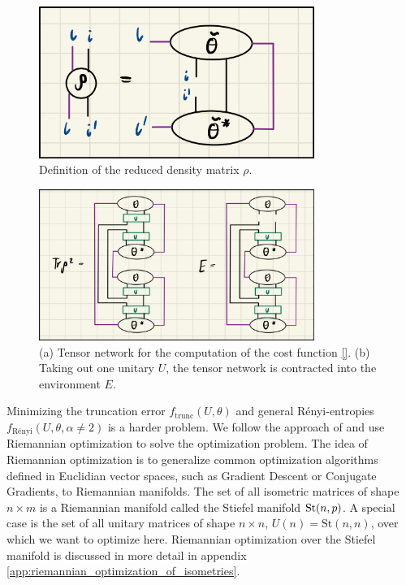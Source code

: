 \begin{figure}
	\centering
	\includegraphics[width=0.8\textwidth]{figures/disoTPS/disentangling_rho_definition.jpeg}
	\caption{Definition of the reduced density matrix $\rho$.}
	\label{fig:disentangling_rho_definition}
\end{figure}
\begin{figure}
	\centering
	\includegraphics[width=0.8\textwidth]{figures/disoTPS/disentangling_evenbly_vidal_algorithm.jpeg}
	\caption{(a) Tensor network for the computation of the cost function \eqref{}. (b) Taking out one unitary $U$, the tensor network is contracted into the environment $E$.}
	\label{fig:disentangling_evenbly_vidal_algorithm}
\end{figure}
Minimizing the truncation error $f_\text{trunc}\left(U,\theta\right)$ and general Rényi-entropies $f_\text{Rényi}\left(U,\theta,\alpha\neq2\right)$ is a harder problem. We follow the approach of \cite{cite:isometric_tensor_network_states_in_two_dimensions, cite:efficient_simulation_of_dynamics_in_two_dimensional_quantum_spin_systems} and use Riemannian optimization \cite{cite:optimization_on_matrix_manifolds, cite:riemannian_optimization_isometric_tensor_networks, cite:riemannian_geometry_automatic_differentiation_quantum_physics, cite:pymanopt} to solve the optimization problem. The idea of Riemannian optimization is to generalize common optimization algorithms defined in Euclidian vector spaces, such as Gradient Descent or Conjugate Gradients, to Riemannian manifolds. The set of all isometric matrices of shape $n\times m$ is a Riemannian manifold called the Stiefel manifold $\text{St}(n,p)$. A special case is the set of all unitary matrices of shape $n\times n$, $U(n)=\text{St}(n, n)$, over which we want to optimize here. Riemannian optimization over the Stiefel manifold is discussed in more detail in appendix \ref{app:riemannian_optimization_of_isometries}. \par
